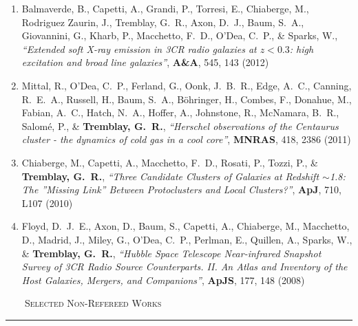 \documentclass[11pt]{article}
\makeatletter
\def\vhrulefill#1{\leavevmode\leaders\hrule\@height#1\hfill \kern\z@}
\makeatother
\begin{document}
\begin{enumerate}[resume]
\item Balmaverde, B., Capetti, A., Grandi, P., Torresi, E., Chiaberge, M.,
Rodriguez Zaurin, J., Tremblay, G.~R., Axon, D.~J., Baum, S.~A.,
Giovannini, G., Kharb, P., Macchetto, F.~D., O'Dea, C.~P.,
\& Sparks, W., \textit{``Extended soft X-ray emission in 3CR radio galaxies at $z< 0.3$: high excitation and broad line galaxies''}, \textbf{A\&A}, 545,  143 (2012)




\item Mittal, R., O'Dea, C.~P., Ferland, G., Oonk, J.~B.~R., Edge, A.~C.,
Canning, R.~E.~A., Russell, H., Baum, S.~A., B{\"o}hringer, H., Combes, F.,
Donahue, M., Fabian, A.~C., Hatch, N.~A., Hoffer, A., Johnstone, R.,
McNamara, B.~R., Salom{\'e}, P.,
\& \textbf{Tremblay, G.~R.}, \textit{``Herschel observations of the Centaurus cluster - the dynamics of cold gas in a cool core''}, \textbf{MNRAS}, 418,  2386 (2011)




\item Chiaberge, M., Capetti, A., Macchetto, F.~D., Rosati, P., Tozzi, P.,
\& \textbf{Tremblay, G.~R.}, \textit{``Three Candidate Clusters of Galaxies at Redshift $\sim$1.8: The ''Missing Link'' Between Protoclusters and Local Clusters?''}, \textbf{ApJ}, 710,  L107 (2010)





\item Floyd, D.~J.~E., Axon, D., Baum, S., Capetti, A., Chiaberge, M.,
Macchetto, D., Madrid, J., Miley, G., O'Dea, C.~P., Perlman, E., Quillen,
A., Sparks, W.,
\& \textbf{Tremblay, G.~R.},  \textit{``Hubble Space Telescope Near-infrared Snapshot Survey of 3CR Radio Source Counterparts. II. An Atlas and Inventory of the Host Galaxies, Mergers, and Companions''}, \textbf{ApJS}, 177,  148 (2008)

\end{enumerate}

\noindent \textsc{ ~~~~Selected Non-Refereed Works} \vhrulefill{0.4pt}
\end{document}
